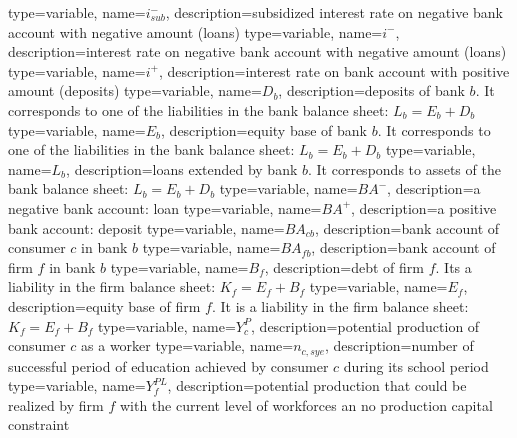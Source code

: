 {%
  type=variable,%
  name={$i_{sub}^-$},%
  description={subsidized interest rate on negative bank account with negative amount (loans)} 
}
{%
  type=variable,%
  name={$i^-$},%
  description={interest rate on negative bank account with negative amount (loans)} 
}
{%
  type=variable,%
  name={$i^+$},%
  description={interest rate on bank account with positive amount (deposits)} 
}
{%
  type=variable,%
  name={$D_b$},%
  description={deposits of bank $b$. It corresponds to one of the liabilities in the bank balance sheet: $L_b=E_b+D_b$} 
}
{%
  type=variable,%
  name={$E_b$},%
  description={equity base of bank $b$. It corresponds to one of the liabilities in the bank balance sheet: $L_b=E_b+D_b$} 
}
{%
  type=variable,%
  name={$L_b$},%
  description={loans extended by bank $b$. It corresponds to assets of the bank balance sheet: $L_b=E_b+D_b$} 
}
{%
  type=variable,%
  name={$BA^-$},%
  description={a negative bank account: loan} 
}
{%
  type=variable,%
  name={$BA^+$},%
  description={a positive bank account: deposit} 
}
{%
  type=variable,%
  name={$BA_{cb}$},%
  description={bank account of consumer $c$ in bank $b$} 
}
{%
  type=variable,%
  name={$BA_{fb}$},%
  description={bank account of firm $f$ in bank $b$} 
}
{%
  type=variable,%
  name={$B_{f}$},%
  description={debt of firm $f$. Its a liability in the firm balance sheet: $K_f=E_f+B_f$} 
}
{%
  type=variable,%
  name={$E_{f}$},%
  description={equity base of firm $f$. It is a liability in the firm balance sheet: $K_f=E_f+B_f$} 
}
{%
  type=variable,%
  name={$Y^{P}_{c}$},%
  description={potential production of consumer $c$ as a worker} 
}
{%
  type=variable,%
  name={$n_{c,sye}$},%
  description={number of successful period of education achieved by consumer $c$ during its school period} 
}
{%
  type=variable,%
  name={$Y^{PL}_{f}$},%
  description={potential production that could be realized by firm $f$ with the current level of workforces an no production capital constraint} 
}
